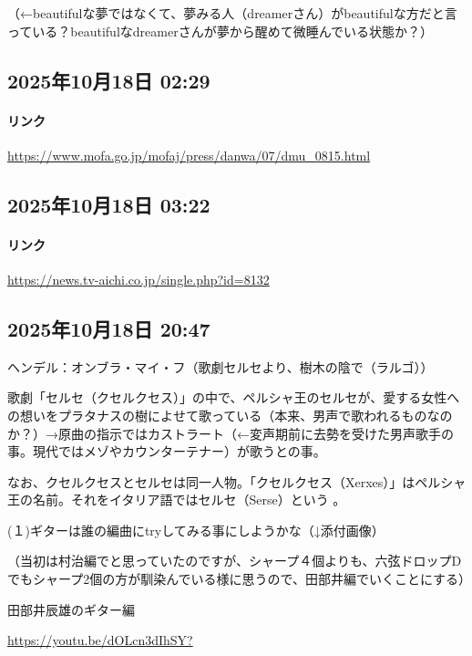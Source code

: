 （←beautifulな夢ではなくて、夢みる人（dreamerさん）がbeautifulな方だと言っている？beautifulなdreamerさんが夢から醒めて微睡んでいる状態か？）

\subsection*{2025年10月18日 02:29}

\paragraph{リンク}
\url{https://www.mofa.go.jp/mofaj/press/danwa/07/dmu_0815.html}

\subsection*{2025年10月18日 03:22}

\paragraph{リンク}
\url{https://news.tv-aichi.co.jp/single.php?id=8132}

\subsection*{2025年10月18日 20:47}

ヘンデル：オンブラ・マイ・フ（歌劇セルセより、樹木の陰で（ラルゴ））

歌劇「セルセ（クセルクセス）」の中で、ペルシャ王のセルセが、愛する女性への想いをプラタナスの樹によせて歌っている（本来、男声で歌われるものなのか？）→原曲の指示ではカストラート（←変声期前に去勢を受けた男声歌手の事。現代ではメゾやカウンターテナー）が歌うとの事。

なお、クセルクセスとセルセは同一人物。「クセルクセス（Xerxes）」はペルシャ王の名前。それをイタリア語ではセルセ（Serse）という 。

(１)ギターは誰の編曲にtryしてみる事にしようかな（↓添付画像）

（当初は村治編でと思っていたのですが、シャープ４個よりも、六弦ドロップDでもシャープ2個の方が馴染んでいる様に思うので、田部井編でいくことにする）

田部井辰雄のギター編

\url{https://youtu.be/dOLcn3dIhSY?}

